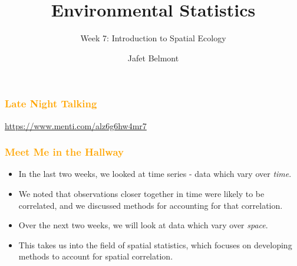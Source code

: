 \documentclass[parskip,12pt]{beamer}
\title{Environmental Statistics}
\subtitle{Week 7: Introduction to Spatial Ecology}
\author{Jafet Belmont}
\date{}
\begin{document}
\begin{frame}
\frametitle{\textcolor{orange}{Late Night Talking}}
\vspace{-3mm}
\url{https://www.menti.com/alz6g6hw4mr7}
\end{frame}

\begin{frame}
\frametitle{\textcolor{orange}{Meet Me in the Hallway}}
 \begin{itemize}
\item In the last two weeks, we looked at time series - data which vary over \emph{time}.
\vspace{3mm}
\item We noted that observations closer together in time were likely to be correlated, and we discussed methods for accounting for that correlation.
\vspace{3mm}
\item Over the next two weeks, we will look at data which vary over \emph{space}.
\vspace{3mm}
\item This takes us into the field of spatial statistics, which focuses on developing methods to account for spatial correlation. 
\end{itemize}
\end{frame}
\end{document}
